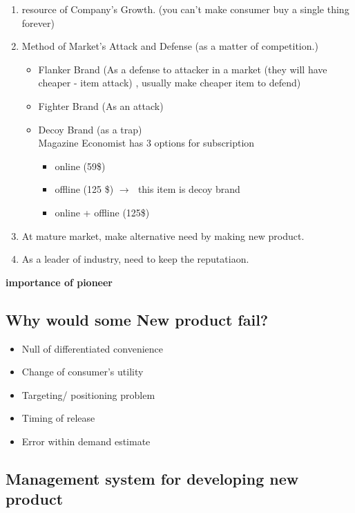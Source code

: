 \documentclass[12pt]{article}
\newcommand{\ra}{$\rightarrow \text{ }$}
\begin{document}
\begin{enumerate}
	\item resource of Company's Growth. (you can't make consumer buy a single thing forever)
	\item Method of Market's Attack and Defense (as a matter of competition.) \\
	\begin{itemize}
		\item Flanker Brand (As a defense to attacker in a market (they will have cheaper - item attack) , usually make cheaper item to defend)
		\item Fighter Brand (As an attack)
		\item Decoy Brand (as a trap) \\
		Magazine Economist has 3 options for subscription
		\begin{itemize}
			\item online (59\$)
			\item offline (125 \$) \ra this item is decoy brand
			\item online + offline (125\$)
		\end{itemize}
	\end{itemize}
	\item At mature market, make alternative need by making new product.
	\item As a leader of industry, need to keep the reputatiaon.
\end{enumerate}

\textbf{importance of pioneer}

\subsection{Why would some New product fail?}
\begin{itemize}
	\item Null of differentiated convenience
	\item Change of consumer's utility
	\item  Targeting/ positioning problem
	\item Timing of release
	\item Error within demand estimate
\end{itemize}

\subsection{Management system for developing new product}
\end{document}
